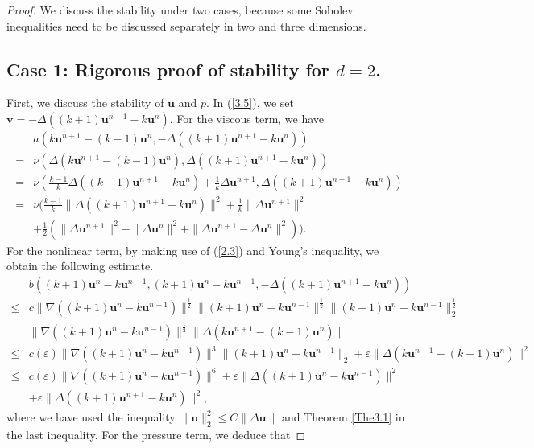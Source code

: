 \documentclass[10pt,a4paper]{amsart}
\theoremstyle{thmm}
\begin{document}
	\begin{proof}
		We discuss the stability under two cases, because some Sobolev inequalities need to be discussed separately in two and three dimensions.
		\subsection*{Case 1: Rigorous proof of  stability for \(d = 2\).}
		First, we discuss the stability of $\bm{u}$ and $p$. In (\ref{3.5}), we set $\bm{v} = -\Delta\left((k + 1)\bm{u}^{n+1} - k \bm{u}^n\right)$. For the viscous term, we have
		\begin{align}\label{3.13}
			&a(k\bm{u}^{n+1}-(k-1)\bm{u}^n,-\Delta((k+1)\bm{u}^{n+1}-k\bm{u}^n))\nonumber\\
			= &\nu(\Delta(k\bm{u}^{n+1}-(k-1)\bm{u}^n),\Delta((k+1)\bm{u}^{n+1}-k\bm{u}^n))\nonumber\\
			= &\nu(\frac{k-1}{k}\Delta((k+1)\bm{u}^{n+1}-k\bm{u}^n)+\frac{1}{k}\Delta\bm{u}^{n+1},\Delta((k+1)\bm{u}^{n+1}-k\bm{u}^n))\nonumber\\
			= &\nu(\frac{k-1}{k}\|\Delta((k+1)\bm{u}^{n+1}-k\bm{u}^n)\|^2+\frac{1}{k}\|\Delta\bm{u}^{n+1}\|^2\nonumber\\
			&+\frac{1}{2}(\|\Delta\bm{u}^{n+1}\|^2-\|\Delta\bm{u}^n\|^2+\|\Delta\bm{u}^{n+1}-\Delta\bm{u}^n\|^2)).
		\end{align}
		For the nonlinear term, by making use of (\ref{2.3}) and Young’s inequality, we obtain the following estimate.
		{ 
		\begin{align}\label{3.14}
			&b((k+1)\bm{u}^n-k\bm{u}^{n-1},(k+1)\bm{u}^n-k\bm{u}^{n-1},-\Delta((k+1)\bm{u}^{n+1}-k\bm{u}^n))\nonumber\\
			\leq & c\|\nabla((k+1)\bm{u}^n-k\bm{u}^{n-1})\|^\frac{1}{2}\|(k+1)\bm{u}^n-k\bm{u}^{n-1}\|^{\frac{1}{2}}\|(k+1)\bm{u}^n-k\bm{u}^{n-1}\|^\frac{1}{2}_2\nonumber\\
			&\|\nabla((k+1)\bm{u}^n-k\bm{u}^{n-1})\|^\frac{1}{2}\|\Delta(k\bm{u}^{n+1}-(k-1)\bm{u}^n)\|\nonumber\\
			\leq & c(\varepsilon)\|\nabla((k+1)\bm{u}^n-k\bm{u}^{n-1})\|^3\|(k+1)\bm{u}^n-k\bm{u}^{n-1}\|_2 +\varepsilon\|\Delta(k\bm{u}^{n+1}-(k-1)\bm{u}^n)\|^2\nonumber\\
			\leq & c(\varepsilon) \|\nabla((k+1)\bm{u}^n-k\bm{u}^{n-1})\|^6+\varepsilon\|\Delta((k+1)\bm{u}^n-k\bm{u}^{n-1})\|^2 \nonumber\\
			&  +\varepsilon\|\Delta((k+1)\bm{u}^{n+1}-k\bm{u}^n)\|^2,
		\end{align}
	}where we have used the inequality \( \| \bm{u}\|_2^2 \leq C \|\Delta \bm{u}\|  \) and Theorem \ref{The3.1} in the last inequality.  For the pressure term, we deduce that

\end{proof}
\end{document}
